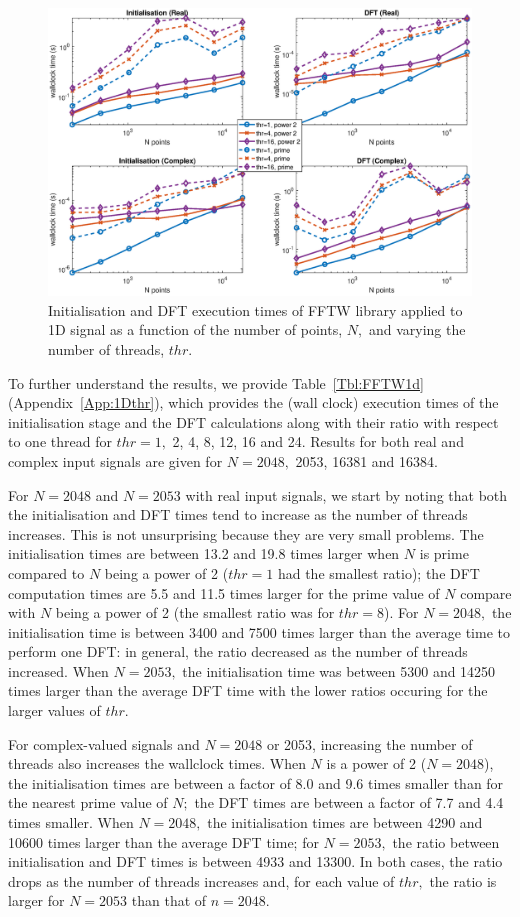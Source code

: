\documentclass[a4paper]{article}
\begin{document}
\begin{figure}[!htb]
    \centering
    \includegraphics[width=0.9\linewidth]{../results/fftw_1d_thr.eps}
  \caption{Initialisation and DFT execution times of FFTW library applied to 1D signal as a function of the
    number of points, $N,$ and varying the number of threads, $thr.$ }
  \label{fig:1DFFTW}
\end{figure}

To further understand the results, we provide Table~\ref{Tbl:FFTW1d}
(Appendix~\ref{App:1Dthr}), which provides the (wall clock) execution
times of the initialisation stage and the DFT calculations along with
their ratio with respect to one thread for $thr=1,$ 2, 4, 8, 12, 16
and 24. Results for both real and complex input signals are given for
$N=2048,$ 2053, 16381 and 16384.

For $N=2048$ and $N=2053$ with real input signals, we start by
noting that both the initialisation and DFT times tend to increase as
the number of threads increases. This is not unsurprising because they
are very small problems. The
initialisation times are between 13.2 and 19.8 times larger when $N$
is prime compared to $N$ being a power of 2 ($thr=1$ had the smallest
ratio); the DFT computation times are 5.5 and 11.5 times larger for
the prime value of $N$ compare with $N$ being a power of 2 (the
smallest ratio was for $thr=8$). For $N=2048,$ the initialisation time
is between 3400 and 7500 times larger than the average time to perform
one DFT: in general, the ratio decreased as the number of threads
increased. When $N=2053,$ the initialisation time was between 5300 and
14250 times larger than the average DFT time with the lower ratios
occuring for the larger values of $thr.$

For complex-valued signals and $N=2048$ or 2053, increasing the number
of threads also increases the wallclock times. When $N$ is a power of
2 ($N=2048$), the initialisation times are between a factor of 8.0 and
9.6 times smaller than for the nearest prime value of $N;$ the DFT
times are between a factor of 7.7 and 4.4 times smaller. When
$N=2048,$ the initialisation times are between 4290 and 10600 times
larger than the average DFT time; for $N=2053,$ the ratio between
initialisation and DFT times is between 4933 and 13300. In both cases,
the ratio drops as the number of threads increases and, for each value
of $thr,$ the ratio is larger for $N=2053$ than that of $n=2048.$
\end{document}
